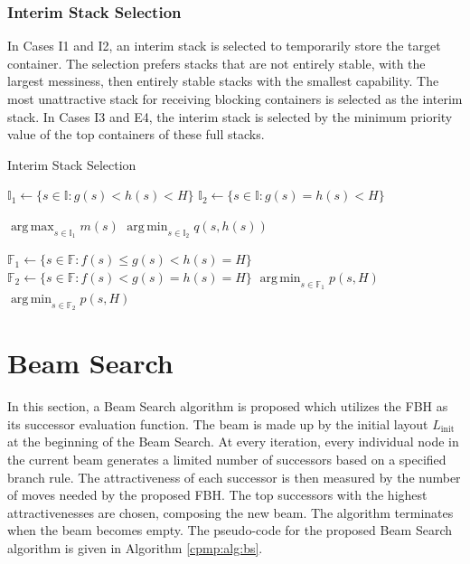 \documentclass{article}
\DeclareMathOperator*{\argmin}{arg\,min}
\DeclareMathOperator*{\argmax}{arg\,max}
\begin{document}
\subsubsection{Interim Stack Selection}

In Cases I1 and I2, an interim stack is selected to temporarily store the target container. 
The selection prefers stacks that are not entirely stable, with the largest messiness, then entirely stable stacks with the smallest capability. The most unattractive stack for receiving blocking containers is selected as the interim stack. In Cases I3 and E4, the interim stack is selected by the minimum priority value of the top containers of these full stacks.

\begin{algorithm}[htbp]

\caption{Interim Stack Selection}


{
  $\mathbb{I}_1\gets \{s\in \mathbb{I}: g(s)<h(s)<H\}$\;
  $\mathbb{I}_2\gets \{s\in \mathbb{I}:  g(s)=h(s)<H\}$\;
  
  {
    \Return $\argmax_{s\in\mathbb{I}_1} m(s)$\;
  }
  \Else
  {
    \Return $\argmin_{s\in\mathbb{I}_2} q(s,h(s))$\;
  }
}




{
  $\mathbb{F}_1\gets \{s\in \mathbb{F}: f(s)\le g(s)<h(s)=H \}$\;
  $\mathbb{F}_2\gets \{s\in \mathbb{F}: f(s)< g(s)=h(s)=H \}$\;
  {
    \Return $\argmin_{s\in\mathbb{F}_1} p(s,H)$\;
  }
  \Else
  {
    \Return $\argmin_{s\in\mathbb{F}_2} p(s,H)$\;
  }
}


\end{algorithm}




\section{Beam Search}
\label{cpmp:sec:beam}

In this section, a Beam Search algorithm is proposed which utilizes the FBH as its successor evaluation function.
The beam is  made up by the initial layout $L_\mathrm{init}$ at the beginning of the Beam Search. At every iteration, every individual node in the current beam generates a limited number of successors based on a specified branch rule. The attractiveness of each successor is then measured by the number of moves needed by the proposed FBH\@. The top successors with the highest attractivenesses are chosen, composing the new beam. The algorithm terminates when the beam becomes empty.
The pseudo-code for the proposed Beam Search algorithm is given in 
Algorithm \ref{cpmp:alg:bs}.
\end{document}
